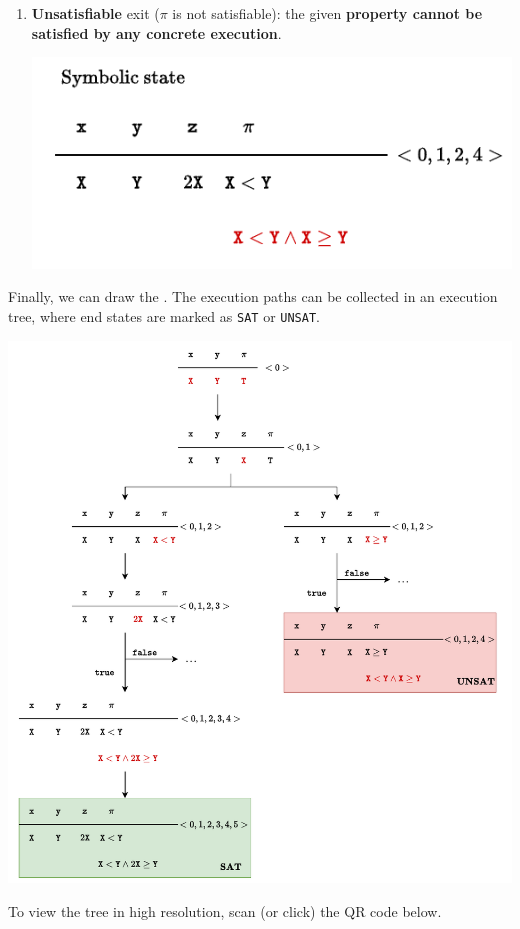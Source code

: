 \begin{examplebox}
\begin{enumerate}
\begin{enumerate}
            \item \textcolor{Red2}{\textbf{Unsatisfiable}} exit ($\pi$ is not satisfiable): the given \textbf{property cannot be satisfied by any concrete execution}.
            \begin{center}
                \includegraphics[width=.6\textwidth]{img/symbolic-state-9.pdf}
            \end{center}
        \end{enumerate}
    \end{enumerate}
    Finally, we can draw the . The execution paths can be collected in an execution tree, where end states are marked as \texttt{SAT} or \texttt{UNSAT}.
    \begin{center}
        \includegraphics[width=\textwidth]{img/symbolic-state-10.pdf}
    \end{center}
    To view the tree in high resolution, scan (or click) the QR code below.
    \begin{center}
    \end{center}
\end{examplebox}

